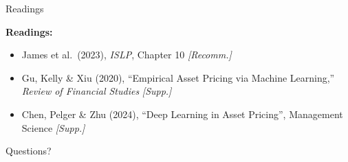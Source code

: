 \documentclass[10pt]{beamer}
\begin{document}

\begin{frame}{Readings}

  \textbf{Readings:}
  \begin{itemize}
    \item James et al.\ (2023), \textit{ISLP}, Chapter 10 \hfill \textit{[Recomm.]}
    \item Gu, Kelly \& Xiu (2020), ``Empirical Asset Pricing via Machine Learning,'' \textit{Review of Financial Studies} \hfill \textit{[Supp.]}
    \item Chen, Pelger \& Zhu (2024), ``Deep Learning in Asset Pricing'', Management Science \hfill \textit{[Supp.]}
  \end{itemize}


\end{frame}


\begin{frame}[plain]
  \centering
  \vfill
  {\Large Questions?}
  \vfill
\end{frame}
\end{document}
